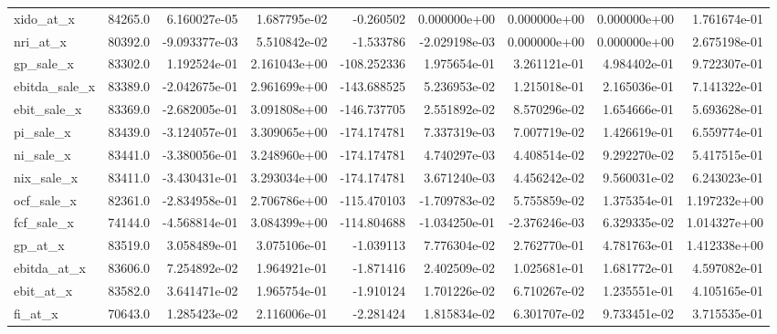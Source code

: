 \documentclass[10pt]{article}
\begin{document}
\begin{landscape}
\begin{longtable}{lrrrrrrrr}
xido\_at\_x               &   84265.0 &  6.160027e-05 &  1.687795e-02 &     -0.260502 &  0.000000e+00 &  0.000000e+00 &  0.000000e+00 &  1.761674e-01 \\
nri\_at\_x                &   80392.0 & -9.093377e-03 &  5.510842e-02 &     -1.533786 & -2.029198e-03 &  0.000000e+00 &  0.000000e+00 &  2.675198e-01 \\
gp\_sale\_x               &   83302.0 &  1.192524e-01 &  2.161043e+00 &   -108.252336 &  1.975654e-01 &  3.261121e-01 &  4.984402e-01 &  9.722307e-01 \\
ebitda\_sale\_x           &   83389.0 & -2.042675e-01 &  2.961699e+00 &   -143.688525 &  5.236953e-02 &  1.215018e-01 &  2.165036e-01 &  7.141322e-01 \\
ebit\_sale\_x             &   83369.0 & -2.682005e-01 &  3.091808e+00 &   -146.737705 &  2.551892e-02 &  8.570296e-02 &  1.654666e-01 &  5.693628e-01 \\
pi\_sale\_x               &   83439.0 & -3.124057e-01 &  3.309065e+00 &   -174.174781 &  7.337319e-03 &  7.007719e-02 &  1.426619e-01 &  6.559774e-01 \\
ni\_sale\_x               &   83441.0 & -3.380056e-01 &  3.248960e+00 &   -174.174781 &  4.740297e-03 &  4.408514e-02 &  9.292270e-02 &  5.417515e-01 \\
nix\_sale\_x              &   83411.0 & -3.430431e-01 &  3.293034e+00 &   -174.174781 &  3.671240e-03 &  4.456242e-02 &  9.560031e-02 &  6.243023e-01 \\
ocf\_sale\_x              &   82361.0 & -2.834958e-01 &  2.706786e+00 &   -115.470103 & -1.709783e-02 &  5.755859e-02 &  1.375354e-01 &  1.197232e+00 \\
fcf\_sale\_x              &   74144.0 & -4.568814e-01 &  3.084399e+00 &   -114.804688 & -1.034250e-01 & -2.376246e-03 &  6.329335e-02 &  1.014327e+00 \\
gp\_at\_x                 &   83519.0 &  3.058489e-01 &  3.075106e-01 &     -1.039113 &  7.776304e-02 &  2.762770e-01 &  4.781763e-01 &  1.412338e+00 \\
ebitda\_at\_x             &   83606.0 &  7.254892e-02 &  1.964921e-01 &     -1.871416 &  2.402509e-02 &  1.025681e-01 &  1.681772e-01 &  4.597082e-01 \\
ebit\_at\_x               &   83582.0 &  3.641471e-02 &  1.965754e-01 &     -1.910124 &  1.701226e-02 &  6.710267e-02 &  1.235551e-01 &  4.105165e-01 \\
fi\_at\_x                 &   70643.0 &  1.285423e-02 &  2.116006e-01 &     -2.281424 &  1.815834e-02 &  6.301707e-02 &  9.733451e-02 &  3.715535e-01 \\

\end{longtable}
\end{landscape}
\end{document}
